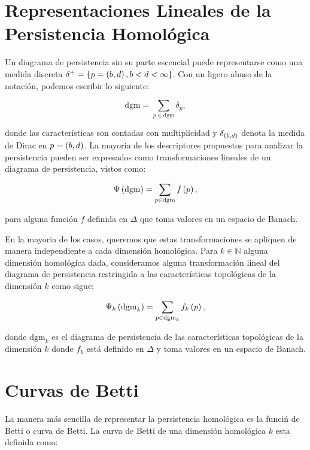 \section{Representaciones Lineales de la Persistencia Homol\'ogica}

Un diagrama de persistencia sin su parte escencial puede representarse como
una medida discreta $\delta^{+}=\left\{p=\left(b,d\right),b<d<\infty\right\}$.
Con un ligero abuso de la notaci\'on, podemos escribir lo siguiente:

\begin{equation*}
    \mathrm{dgm}=\sum_{p\in\mathrm{dgm}}\delta_{p},
\end{equation*}

\noindent donde las caracter\'isticas son contadas con multiplicidad y
$\delta_{\left(b,d\right)}$ denota la medida de Dirac en $p=\left(b,d\right)$.
La mayoria de los descriptores propuestos para analizar la persistencia pueden
ser expresados como transformaciones lineales de un diagrama de persistencia,
vistos como:

\begin{equation*}
    \Psi\left(\mathrm{dgm}\right)=\sum_{p\in\mathrm{dgm}}f\left(p\right),
\end{equation*}

\noindent para alguna funci\'on $f$ definida en $\Delta$ que toma valores en
un espacio de Banach.

En la mayoria de los casos, queremos que estas transformaciones se apliquen de manera
independiente a cada dimensi\'on homol\'ogica. Para $k\in\mathbb{N}$ alguna dimensi\'on
homol\'ogica dada, consideramos alguna transformaci\'on lineal del diagrama de persistencia
restringida a las caracter\'isticas topol\'ogicas de la dimensi\'on $k$ como sigue:

\begin{equation}\label{eq: 4.5}
    \Psi_{k}\left(\mathrm{dgm}_{k}\right)=\sum_{p\in\mathrm{dgm}_{k}}f_{k}\left(p\right),
\end{equation}

\noindent donde $\mathrm{dgm}_{k}$ es el diagrama de persistencia de las caracter\'isticas
topol\'ogicas de la dimensi\'on $k$ donde $f_{k}$ est\'a definido en $\Delta$ y toma valores
en un espacio de Banach.

\section*{Curvas de Betti}

La manera m\'as sencilla de representar la persistencia homol\'ogica es la funci\'n
de Betti o curva de Betti. La curva de Betti de una dimensi\'on homol\'ogica $k$ esta
definida como:

